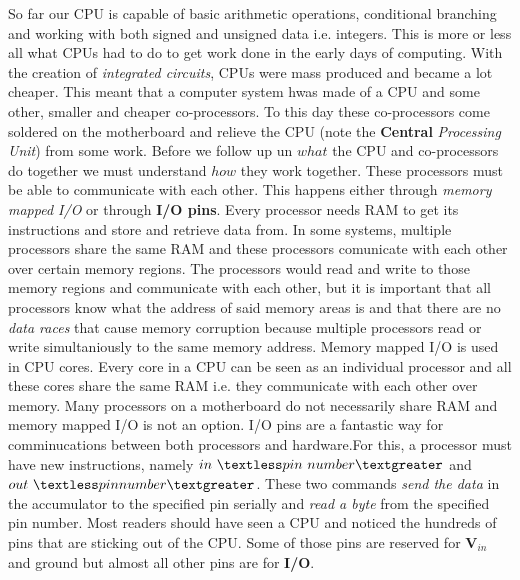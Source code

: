 So far our CPU is capable of basic arithmetic operations, conditional branching and working with
both signed and unsigned data i.e. integers. This is more or less all what CPUs had to do to get work
done in the early days of computing. With the creation of \textit{integrated circuits}, CPUs were mass 
produced and became a lot cheaper. This meant that a computer system hwas made of a CPU and some
other, smaller and cheaper co-processors. To this day these co-processors come soldered on the
motherboard and relieve the CPU (note the \textbf{Central} \textit{Processing Unit}) from some work. Before we
follow up un $what$ the CPU and co-processors do together we must understand $how$ they work together.
These processors must be able to communicate with each other. This happens either through
\textit{memory mapped I/O} or through \textbf{I/O pins}. Every processor needs RAM to get its instructions and
store and retrieve data from. In some systems, multiple processors share the same RAM and these 
processors comunicate with each other over certain memory regions. The processors would read and 
write to those memory regions and communicate with each other, but it is important that all processors
know what the address of said memory areas is and that there are no \textit{data races} that cause memory
corruption because multiple processors read or write simultaniously to the same memory address. 
Memory mapped I/O is used in CPU cores. Every core in a CPU can be seen as an individual processor
and all these cores share the same RAM i.e. they communicate with each other over memory. 
Many processors on a motherboard do not necessarily share RAM and memory mapped I/O is not an option.
I/O pins are a fantastic way for comminucations between both processors and hardware.For this, a
processor must have new instructions, namely $in\ \textless pin\ number\textgreater$ and $out\ \textless pin number\textgreater$. These two 
commands \textit{send the data} in the accumulator to the specified pin serially and \textit{read a byte} from the 
specified pin number. Most readers should have seen a CPU and noticed the hundreds of pins that are
sticking out of the CPU. Some of those pins are reserved for $\textbf{V}_\textit{in}$ and ground
but almost all other pins are for \textbf{I/O}.
